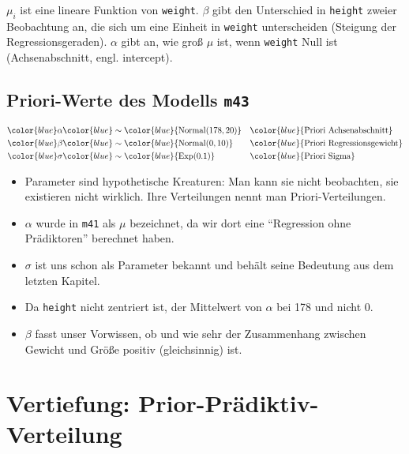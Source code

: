 \documentclass[
  a4paper,
  DIV=11]{scrreprt}
\providecommand{\tightlist}{%
  \setlength{\itemsep}{0pt}\setlength{\parskip}{0pt}}\usepackage{longtable,booktabs,array}
\theoremstyle{definition}
\theoremstyle{remark}
\begin{document}
\(\mu_i\) ist eine lineare Funktion von \texttt{weight}. \(\beta\) gibt
den Unterschied in \texttt{height} zweier Beobachtung an, die sich um
eine Einheit in \texttt{weight} unterscheiden (Steigung der
Regressionsgeraden). \(\alpha\) gibt an, wie groß \(\mu\) ist, wenn
\texttt{weight} Null ist (Achsenabschnitt, engl. intercept).

\hypertarget{priori-werte-des-modells-m43}{%
\subsection{\texorpdfstring{Priori-Werte des Modells
\texttt{m43}}{Priori-Werte des Modells m43}}\label{priori-werte-des-modells-m43}}

\begin{align*}
\color{blue}\alpha & \color{blue}\sim \color{blue}{\operatorname{Normal}(178, 20)} && \color{blue}{\text{Priori Achsenabschnitt}} \\
\color{blue}\beta  & \color{blue}\sim \color{blue}{\operatorname{Normal}(0, 10)}  && \color{blue}{\text{Priori Regressionsgewicht}}\\
\color{blue}\sigma & \color{blue}\sim \color{blue}{\operatorname{Exp}(0.1)}  && \color{blue}{\text{Priori Sigma}}
\end{align*}

\begin{itemize}
\tightlist
\item
  Parameter sind hypothetische Kreaturen: Man kann sie nicht beobachten,
  sie existieren nicht wirklich. Ihre Verteilungen nennt man
  Priori-Verteilungen.
\item
  \(\alpha\) wurde in \texttt{m41} als \(\mu\) bezeichnet, da wir dort
  eine ``Regression ohne Prädiktoren'' berechnet haben.
\item
  \(\sigma\) ist uns schon als Parameter bekannt und behält seine
  Bedeutung aus dem letzten Kapitel.
\item
  Da \texttt{height} nicht zentriert ist, der Mittelwert von \(\alpha\)
  bei 178 und nicht 0.
\item
  \(\beta\) fasst unser Vorwissen, ob und wie sehr der Zusammenhang
  zwischen Gewicht und Größe positiv (gleichsinnig) ist.
\end{itemize}

\hypertarget{vertiefung-prior-pruxe4diktiv-verteilung}{%
\section{Vertiefung:
Prior-Prädiktiv-Verteilung}\label{vertiefung-prior-pruxe4diktiv-verteilung}}
\end{document}

